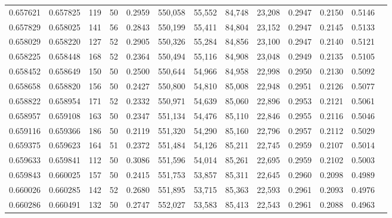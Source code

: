 \begin{tabular}{rrrrrrrrrrrrr}
0.657621 & 0.657825 &   119 &  50 &                                     0.2959 & 550,058 &  55,552 &  84,748 &  23,208 & 0.2947 & 0.2150 & 0.5146 \\
0.657829 & 0.658025 &   141 &  56 &                                     0.2843 & 550,199 &  55,411 &  84,804 &  23,152 & 0.2947 & 0.2145 & 0.5133 \\
0.658029 & 0.658220 &   127 &  52 &                                     0.2905 & 550,326 &  55,284 &  84,856 &  23,100 & 0.2947 & 0.2140 & 0.5121 \\
0.658225 & 0.658448 &   168 &  52 &                                     0.2364 & 550,494 &  55,116 &  84,908 &  23,048 & 0.2949 & 0.2135 & 0.5105 \\
0.658452 & 0.658649 &   150 &  50 &                                     0.2500 & 550,644 &  54,966 &  84,958 &  22,998 & 0.2950 & 0.2130 & 0.5092 \\
0.658658 & 0.658820 &   156 &  50 &                                     0.2427 & 550,800 &  54,810 &  85,008 &  22,948 & 0.2951 & 0.2126 & 0.5077 \\
0.658822 & 0.658954 &   171 &  52 &                                     0.2332 & 550,971 &  54,639 &  85,060 &  22,896 & 0.2953 & 0.2121 & 0.5061 \\
0.658957 & 0.659108 &   163 &  50 &                                     0.2347 & 551,134 &  54,476 &  85,110 &  22,846 & 0.2955 & 0.2116 & 0.5046 \\
0.659116 & 0.659366 &   186 &  50 &                                     0.2119 & 551,320 &  54,290 &  85,160 &  22,796 & 0.2957 & 0.2112 & 0.5029 \\
0.659375 & 0.659623 &   164 &  51 &                                     0.2372 & 551,484 &  54,126 &  85,211 &  22,745 & 0.2959 & 0.2107 & 0.5014 \\
0.659633 & 0.659841 &   112 &  50 &                                     0.3086 & 551,596 &  54,014 &  85,261 &  22,695 & 0.2959 & 0.2102 & 0.5003 \\
0.659843 & 0.660025 &   157 &  50 &                                     0.2415 & 551,753 &  53,857 &  85,311 &  22,645 & 0.2960 & 0.2098 & 0.4989 \\
0.660026 & 0.660285 &   142 &  52 &                                     0.2680 & 551,895 &  53,715 &  85,363 &  22,593 & 0.2961 & 0.2093 & 0.4976 \\
0.660286 & 0.660491 &   132 &  50 &                                     0.2747 & 552,027 &  53,583 &  85,413 &  22,543 & 0.2961 & 0.2088 & 0.4963 \\

\end{tabular}
